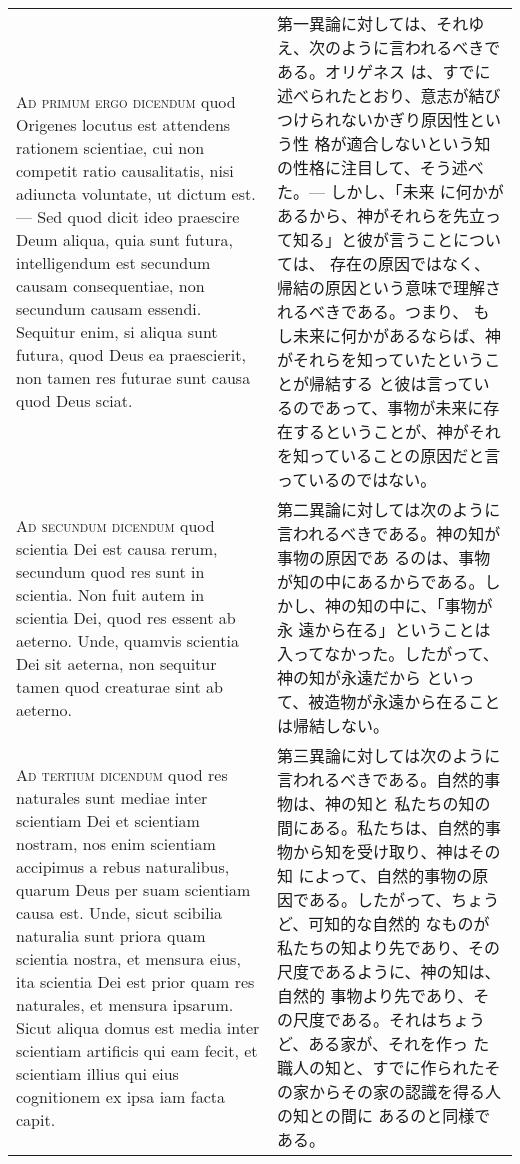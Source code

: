 \documentclass[10pt]{jsarticle} %
\begin{document}
\begin{longtable}{p{21em}p{21em}}
\\


{\scshape Ad primum ergo dicendum} quod Origenes locutus est attendens
rationem scientiae, cui non competit ratio causalitatis, nisi adiuncta
voluntate, ut dictum est. --- Sed quod dicit ideo praescire Deum
aliqua, quia sunt futura, intelligendum est secundum causam
consequentiae, non secundum causam essendi. Sequitur enim, si aliqua
sunt futura, quod Deus ea praescierit, non tamen res futurae sunt
causa quod Deus sciat.


&

第一異論に対しては、それゆえ、次のように言われるべきである。オリゲネス
は、すでに述べられたとおり、意志が結びつけられないかぎり原因性という性
格が適合しないという知の性格に注目して、そう述べた。--- しかし、「未来
に何かがあるから、神がそれらを先立って知る」と彼が言うことについては、
存在の原因ではなく、帰結の原因という意味で理解されるべきである。つまり、
もし未来に何かがあるならば、神がそれらを知っていたということが帰結する
と彼は言っているのであって、事物が未来に存在するということが、神がそれ
を知っていることの原因だと言っているのではない。

\\


{\scshape Ad secundum dicendum} quod scientia Dei est causa rerum,
secundum quod res sunt in scientia. Non fuit autem in scientia Dei,
quod res essent ab aeterno. Unde, quamvis scientia Dei sit aeterna,
non sequitur tamen quod creaturae sint ab aeterno.

&


第二異論に対しては次のように言われるべきである。神の知が事物の原因であ
るのは、事物が知の中にあるからである。しかし、神の知の中に、「事物が永
遠から在る」ということは入ってなかった。したがって、神の知が永遠だから
といって、被造物が永遠から在ることは帰結しない。

\\


{\scshape Ad tertium dicendum} quod res naturales sunt mediae inter
scientiam Dei et scientiam nostram, nos enim scientiam accipimus a
rebus naturalibus, quarum Deus per suam scientiam causa est. Unde,
sicut scibilia naturalia sunt priora quam scientia nostra, et mensura
eius, ita scientia Dei est prior quam res naturales, et mensura
ipsarum. Sicut aliqua domus est media inter scientiam artificis qui
eam fecit, et scientiam illius qui eius cognitionem ex ipsa iam facta
capit.


&

第三異論に対しては次のように言われるべきである。自然的事物は、神の知と
私たちの知の間にある。私たちは、自然的事物から知を受け取り、神はその知
によって、自然的事物の原因である。したがって、ちょうど、可知的な自然的
なものが私たちの知より先であり、その尺度であるように、神の知は、自然的
事物より先であり、その尺度である。それはちょうど、ある家が、それを作っ
た職人の知と、すでに作られたその家からその家の認識を得る人の知との間に
あるのと同様である。


\end{longtable}
\end{document}
